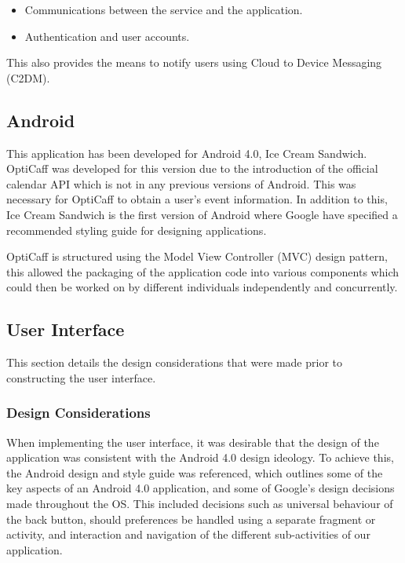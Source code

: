 \begin{itemize}[noitemsep,leftmargin=1cm]
	\item{Communications between the service and the application.}
	\item{Authentication and user accounts.}
\end{itemize}

This also provides the means to notify users using Cloud to Device Messaging (C2DM).            

\subsection{Android}
This application has been developed for Android 4.0, Ice Cream Sandwich. OptiCaff was developed for this version due to the introduction of the official calendar API which is not in any previous versions of Android. This was necessary for OptiCaff to obtain a user’s event information. In addition to this, Ice Cream Sandwich is the first version of Android where Google have specified a recommended styling guide for designing applications.

OptiCaff is structured using the Model View Controller (MVC) design pattern, this allowed the packaging of the application code into various components which could then be worked on by different individuals independently and concurrently.                                                          

\subsection{User Interface}
                   
This section details the design considerations that were made prior to constructing the user interface.
                   
\subsubsection{Design Considerations}
When implementing the user interface, it was desirable that the design of the application was consistent with the Android 4.0 design ideology. To achieve this, the Android design and style guide was referenced, which outlines some of the key aspects of an Android 4.0 application, and some of Google’s design decisions made throughout the OS. This included decisions such as universal behaviour of the back button, should preferences be handled using a separate fragment or activity, and interaction and navigation of the different sub-activities of our application.
                   
